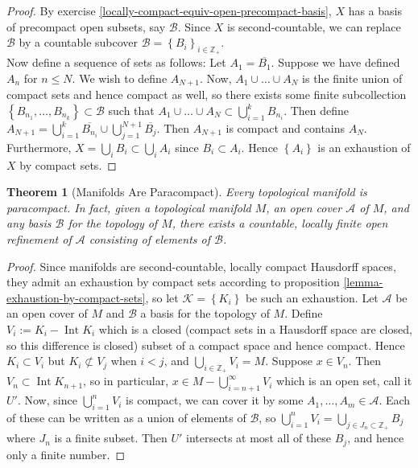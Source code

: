 \documentclass[reqno]{amsart}
\theoremstyle{plain}%
\newtheorem{theorem}{Theorem}[section]
\theoremstyle{definition}
\theoremstyle{remark}
\DeclareMathOperator{\Int}{Int}
\begin{document}
    \begin{proof}
        By exercise \ref{locally-compact-equiv-open-precompact-basis}, 
        $X$ has a basis of precompact open subsets, say $\mathcal{B}$.
        Since $X$ is second-countable, we can replace $\mathcal{B}$ by a 
        countable subcover $\mathcal{B}= \left\{ B_i \right\}_{i
        \in \mathbb{Z}_+}$.\\
        Now define a sequence of sets as follows:
        Let $ A_1 = \overline{B_1}$. 
        Suppose we have defined $A_{n}$ for $n \le N$. We wish to define $A_{N+1}$.
        Now, $A_1 \cup \ldots \cup A_N$ is the finite union of compact sets and
        hence compact as well, so there exists some finite subcollection
        $\left\{ B_{n_1}, \ldots, B_{n_k} \right\} \subset 
        \mathcal{B}$ such that $A_1 \cup \ldots \cup A_N \subset 
        \bigcup_{i=1}^{k} B_{n_i}$. Then define
        $A_{N+1} = \bigcup_{i=1}^{k}\overline{B_{n_i}} \cup 
        \bigcup_{j=1}^{N+1}\overline{B_j}$. Then $A_{N+1}$ is compact and
        contains $A_N$. Furthermore,
        $X = \bigcup_{i} B_i \subset \bigcup_{i} A_i$ since
        $B_i \subset A_i$. Hence $\left\{ A_i \right\} $ is an exhaustion of
        $X$ by
        compact sets.
    \end{proof}

    \begin{theorem}[Manifolds Are Paracompact]
        Every topological manifold is paracompact. In fact, given a topological
        manifold $M$, an open cover $\mathcal{A}$ of $M$, and any basis
        $\mathcal{B}$ for the topology of $M$, there exists a countable, locally
        finite open refinement of $\mathcal{A}$ consisting of elements of
        $\mathcal{B}$.
    \end{theorem}
    \begin{proof}
        Since manifolds are second-countable, locally compact Hausdorff spaces,
        they admit an exhaustion by compact sets according to proposition
        \ref{lemma-exhaustion-by-compact-sets}, so let
        $\mathcal{K}= \left\{ K_i \right\} $ be such an exhaustion. Let
        $\mathcal{A}$ be an open cover of $M$ and
        $\mathcal{B}$ a basis for the topology of $M$. Define
        $V_i := K_i - \Int K_{i}$ which is a closed (compact sets in a Hausdorff
        space are closed, so this difference is closed) subset of a compact space
        and hence compact. Hence
        $K_i \subset V_i$ but $K_i \not \subset V_j$ when $i < j$, and
        $\bigcup_{i \in \mathbb{Z}_{+}} V_i = M$. Suppose
        $x \in V_n$. Then $V_n \subset \Int K_{n+1}$, so in particular,
        $x \in M - \bigcup_{i=n+1}^{\infty} V_i$ which is an open set, call it
        $U'$. Now, since $\bigcup_{i=1}^{n} V_i$ is compact, we can cover it by
        some
        $A_1, \ldots, A_m  \in \mathcal{A}$. Each of these can be written as
        a union of elements of $\mathcal{B}$, so
        $\bigcup_{i=1}^{n} V_i = \bigcup_{j \in J_n \subset \mathbb{Z}_+} B_j$ 
        where
        $J_n$ is a finite subset. Then
        $U'$ intersects at most all of these $B_j$, and hence only a finite number.
    \end{proof}
\end{document}

